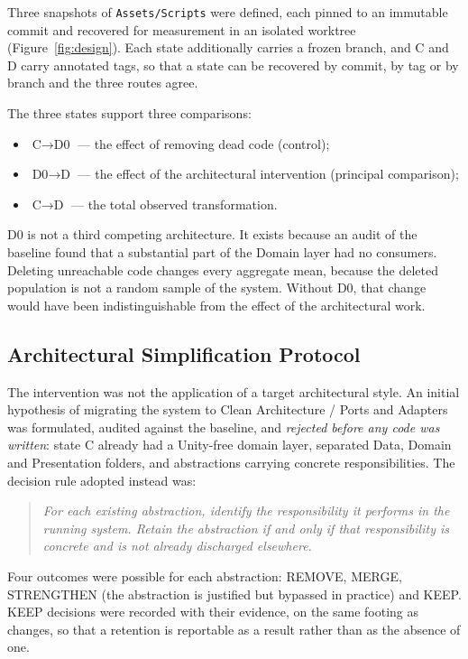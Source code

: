 \documentclass[pdflatex,sn-basic]{sn-jnl}
\begin{document}
Three snapshots of \texttt{Assets/Scripts} were defined, each pinned to an immutable commit and recovered for measurement in an isolated worktree (Figure~\ref{fig:design}). Each state additionally carries a frozen branch, and C and D carry annotated tags, so that a state can be recovered by commit, by tag or by branch and the three routes agree.

The three states support three comparisons:

\begin{itemize}\itemsep2pt
\item $\text{C} \rightarrow \text{D0}$ --- the effect of removing dead code (control);
\item $\text{D0} \rightarrow \text{D}$ --- the effect of the architectural intervention (principal comparison);
\item $\text{C} \rightarrow \text{D}$ --- the total observed transformation.
\end{itemize}

D0 is not a third competing architecture. It exists because an audit of the baseline found that a substantial part of the Domain layer had no consumers. Deleting unreachable code changes every aggregate mean, because the deleted population is not a random sample of the system. Without D0, that change would have been indistinguishable from the effect of the architectural work.

\subsection{Architectural Simplification Protocol}

The intervention was not the application of a target architectural style. An initial hypothesis of migrating the system to Clean Architecture / Ports and Adapters was formulated, audited against the baseline, and \emph{rejected before any code was written}: state C already had a Unity-free domain layer, separated Data, Domain and Presentation folders, and abstractions carrying concrete responsibilities. The decision rule adopted instead was:

\begin{quote}
\emph{For each existing abstraction, identify the responsibility it performs in the running system. Retain the abstraction if and only if that responsibility is concrete and is not already discharged elsewhere.}
\end{quote}

Four outcomes were possible for each abstraction: REMOVE, MERGE, STRENGTHEN (the abstraction is justified but bypassed in practice) and KEEP\@. KEEP decisions were recorded with their evidence, on the same footing as changes, so that a retention is reportable as a result rather than as the absence of one.
\end{document}

